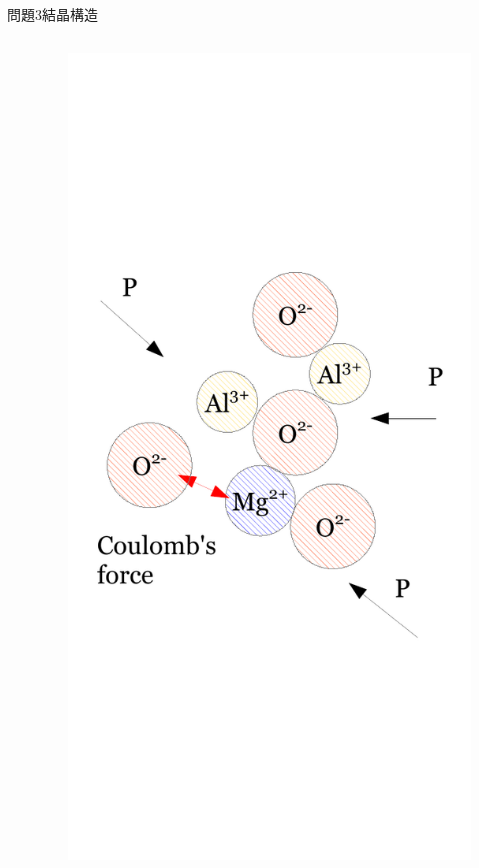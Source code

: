 \documentclass[dvipdfmx]{beamer}
\begin{document}
\begin{frame}{問題3}{結晶構造}
\begin{columns}[t]
\begin{column}{0.7\textwidth}
\end{column}
\begin{column}{0.3\textwidth}
\begin{figure}[htbp]
    \centering
    \includegraphics[bb=0mm 0mm 100.0mm 170.0mm, scale=0.35, type=pdf]{img/problem3.pdf}
\end{figure}
\end{column}
\end{columns}
\end{frame}
\end{document}
